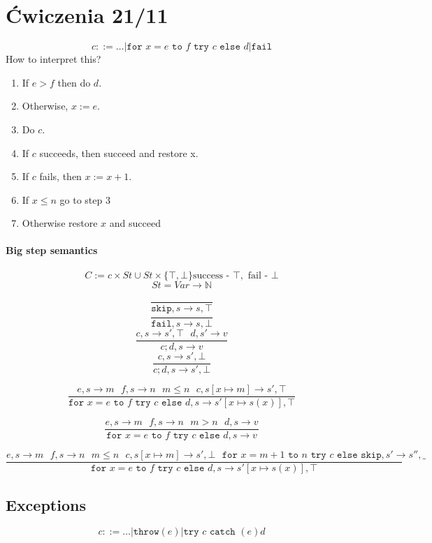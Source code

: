 \documentclass{article}
\begin{document}
\section{Ćwiczenia 21/11}
$$c::=\dots|\texttt{for }x=e\texttt{ to } f\texttt{ try } c\texttt{ else } d|\texttt{fail}$$
How to interpret this?
\begin{enumerate}
	\item If $ e>f $ then do $ d $.
	\item Otherwise, $ x:=e $.
	\item Do $ c $.
	\item If $ c $ succeeds, then succeed and restore x.
	\item If $ c $ fails, then $ x:=x+1 $.
	\item If $ x\le n  $ go to step 3
	\item Otherwise restore $ x $ and succeed
\end{enumerate}
\paragraph{Big step semantics}
$$C:=c\times St\cup St\times\{\top, \bot\}\text{success - }\top,\text{ fail - }\bot$$
$$St=Var\rightarrow\mathbb{N}$$

$$\frac{}{\texttt{skip}, s\rightarrow s,\top}$$
$$\frac{}{\texttt{fail}, s\rightarrow s, \bot}$$
$$\frac{
	c,s\rightarrow s',\top\ \ \ 
	d,s'\rightarrow v
}{
	c;d, s\rightarrow v
}$$
$$\frac{c,s\rightarrow s',\bot}{
	c;d, s\rightarrow s',\bot
}$$

$$\frac{
	e,s\rightarrow m\ \ \ 
	f,s\rightarrow n\ \ \
	m\le n\ \ \ 
	c,s[x\mapsto m]\rightarrow s',\top
}{
	\texttt{for }x=e\texttt{ to }f\texttt{ try }
	c\texttt{ else }d, s\rightarrow s'[x\mapsto s(x)],\top
}$$

$$\frac{
	e,s\rightarrow m\ \ \ 
	f,s\rightarrow n\ \ \
	m > n\ \ \ 
	d,s\rightarrow v
}{
	\texttt{for }x=e\texttt{ to }f\texttt{ try }
	c\texttt{ else }d, s\rightarrow v
}$$

$$\frac{
	e,s\rightarrow m\ \ \ 
	f,s\rightarrow n\ \ \
	m\le n\ \ \ 
	c,s[x\mapsto m]\rightarrow s',\bot\ \ \ 
	\texttt{for }x=m+1\texttt{ to }n\texttt{ try }
	c\texttt{ else skip}, s'\rightarrow s'', \_
}{
	\texttt{for }x=e\texttt{ to }f\texttt{ try }
	c\texttt{ else }d, s\rightarrow s'[x\mapsto s(x)],\top
}$$


\subsection{Exceptions}
$$c::=\dots|\texttt{throw}(e)|\texttt{try } c \texttt{ catch }(e)d$$
\end{document}

